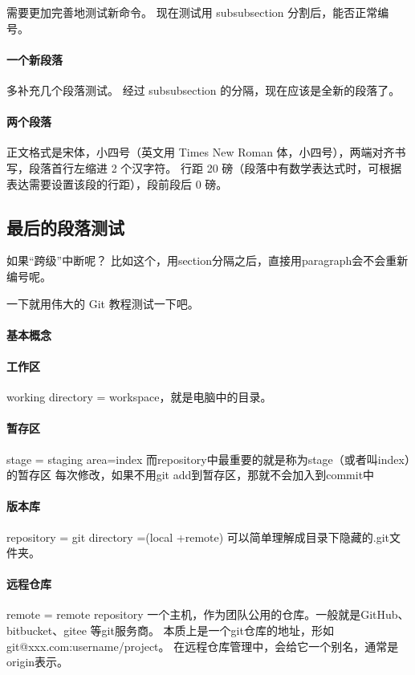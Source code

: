 \documentclass[../Main/thesis]{subfiles}
\begin{document}
需要更加完善地测试新命令。
现在测试用 subsubsection 分割后，能否正常编号。

\paragraph{一个新段落}

多补充几个段落测试。
经过 subsubsection 的分隔，现在应该是全新的段落了。

\paragraph{两个段落} \label{par:second}

正文格式是宋体，小四号（英文用 Times New Roman 体，小四号），两端对齐书写，段落首行左缩进 2 个汉字符。
行距 20 磅（段落中有数学表达式时，可根据表达需要设置该段的行距），段前段后 0 磅。

\subsection{最后的段落测试} \label{ssc:lastpar}

如果“跨级”中断呢？
比如这个，用section分隔之后，直接用paragraph会不会重新编号呢。

一下就用伟大的 Git 教程测试一下吧。

\paragraph{基本概念} \label{par:git-concept}

\paragraph{工作区}
working directory = workspace，就是电脑中的目录。

\paragraph{暂存区}
stage = staging area=index
而repository中最重要的就是称为stage（或者叫index）的暂存区
每次修改，如果不用git add到暂存区，那就不会加入到commit中

\paragraph{版本库}
repository = git directory =(local +remote)
可以简单理解成目录下隐藏的.git文件夹。

\paragraph{远程仓库}
remote = remote repository
一个主机，作为团队公用的仓库。一般就是GitHub、bitbucket、gitee 等git服务商。
本质上是一个git仓库的地址，形如 git@xxx.com:username/project。
在远程仓库管理中，会给它一个别名，通常是origin表示。
\end{document}
